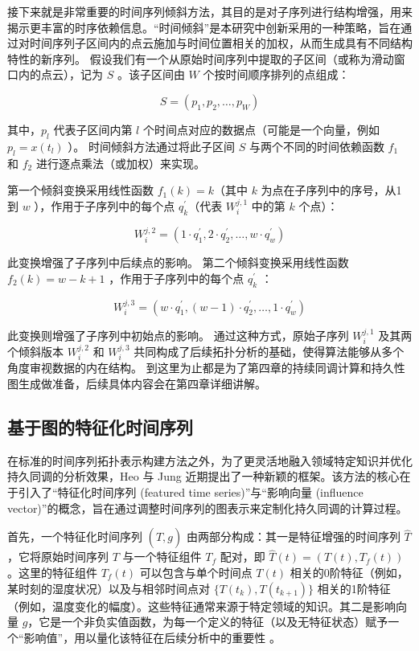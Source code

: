 接下来就是非常重要的时间序列倾斜方法，其目的是对子序列进行结构增强，用来揭示更丰富的时序依赖信息。“时间倾斜”是本研究中创新采用的一种策略，旨在通过对时间序列子区间内的点云施加与时间位置相关的加权，从而生成具有不同结构特性的新序列。
假设我们有一个从原始时间序列中提取的子区间（或称为滑动窗口内的点云），记为 $S$ 。该子区间由 $W$ 个按时间顺序排列的点组成：

\begin{equation}
    S=\left(p_1, p_2, \ldots, p_W\right)
\end{equation}


其中，$p_l$ 代表子区间内第 $l$ 个时间点对应的数据点（可能是一个向量，例如 $p_l=x\left(t_l\right)$ ）。
时间倾斜方法通过将此子区间 $S$ 与两个不同的时间依赖函数 $f_1$ 和 $f_2$ 进行逐点乘法（或加权）来实现。

第一个倾斜变换采用线性函数 $f_1(k)=k$（其中 $k$ 为点在子序列中的序号，从1到 $w$ ），作用于子序列中的每个点 $q_k^{\prime}$（代表 $W_i^{j, 1}$ 中的第 $k$ 个点）：

$$
    W_i^{j, 2}=\left(1 \cdot q_1^{\prime}, 2 \cdot q_2^{\prime}, \ldots, w \cdot q_w^{\prime}\right)
$$


此变换增强了子序列中后续点的影响。
第二个倾斜变换采用线性函数 $f_2(k)=w-k+1$ ，作用于子序列中的每个点 $q_k^{\prime}$ ：

$$
    W_i^{j, 3}=\left(w \cdot q_1^{\prime},(w-1) \cdot q_2^{\prime}, \ldots, 1 \cdot q_w^{\prime}\right)
$$


此变换则增强了子序列中初始点的影响。
通过这种方式，原始子序列 $W_i^{j, 1}$ 及其两个倾斜版本 $W_i^{j, 2}$ 和 $W_i^{j, 3}$ 共同构成了后续拓扑分析的基础，使得算法能够从多个角度审视数据的内在结构。
到这里为止都是为了第四章的持续同调计算和持久性图生成做准备，后续具体内容会在第四章详细讲解。


\subsection{基于图的特征化时间序列}
在标准的时间序列拓扑表示构建方法之外，为了更灵活地融入领域特定知识并优化持久同调的分析效果，Heo 与 Jung \cite{2} 近期提出了一种新颖的框架。该方法的核心在于引入了“特征化时间序列 (featured time series)”与“影响向量 (influence vector)”的概念，旨在通过调整时间序列的图表示来定制化持久同调的计算过程。

首先，一个特征化时间序列 $(\hat{T}, g)$ 由两部分构成：其一是特征增强的时间序列 $\hat{T}$，它将原始时间序列 $T$ 与一个特征组件 $T_f$ 配对，即 $\hat{T}(t) = (T(t), T_f(t))$。这里的特征组件 $T_f(t)$ 可以包含与单个时间点 $T(t)$ 相关的0阶特征（例如，某时刻的湿度状况）以及与相邻时间点对 $\{T(t_k), T(t_{k+1})\}$ 相关的1阶特征（例如，温度变化的幅度）。这些特征通常来源于特定领域的知识。其二是影响向量 $g$，它是一个非负实值函数，为每一个定义的特征（以及无特征状态）赋予一个“影响值”，用以量化该特征在后续分析中的重要性 。

